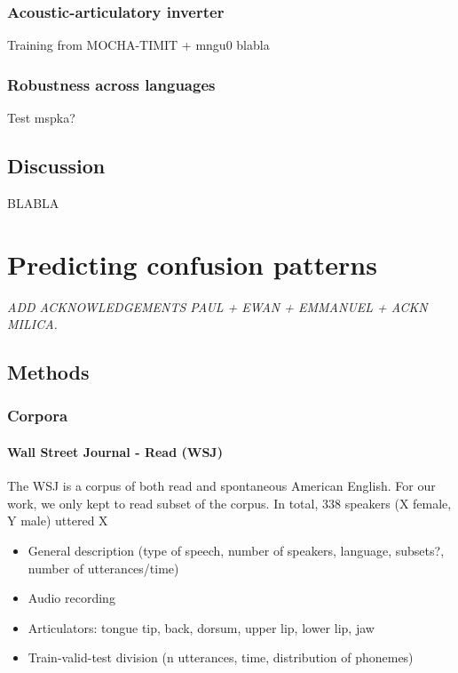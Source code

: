 \subsubsection{Acoustic-articulatory inverter}
{\color{red}Training from MOCHA-TIMIT + mngu0 blabla}


\subsubsection{Robustness across languages}
{\color{red}Test mspka?}


\subsection{Discussion}

BLABLA


\section{Predicting confusion patterns}
\small{\textit{{\color{red}ADD ACKNOWLEDGEMENTS PAUL + EWAN + EMMANUEL + ACKN MILICA.\\}}}

\subsection{Methods}
\subsubsection{Corpora}
\paragraph{Wall Street Journal - Read (WSJ)}
The WSJ \cite{} is a corpus of both read and spontaneous American English. For our work, we only kept to read subset of the corpus. In total, 338 speakers (X female, Y male) uttered X 
{\color{red}
\begin{itemize}
\item General description (type of speech, number of speakers, language, subsets?, number of utterances/time)
\item Audio recording
\item Articulators: tongue {tip, back, dorsum}, upper lip, lower lip, jaw
\item Train-valid-test division (n utterances, time, distribution of phonemes)
\end{itemize}}

